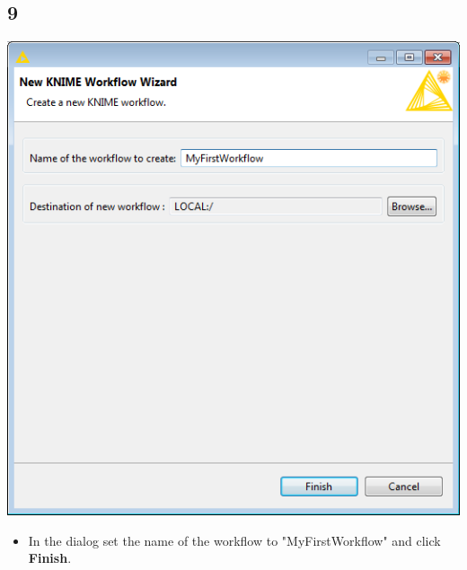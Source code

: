\documentclass{beamer}
\begin{document}
\subsection{9}
\begin{frame}
	\begin{center}
  		\includegraphics[height=0.6\textheight]{9.png}
	\end{center}
	\begin{itemize}
		\item In the dialog set the name of the workflow to "MyFirstWorkflow" and click \textbf{Finish}.		
	\end{itemize}
\end{frame}
\end{document}

